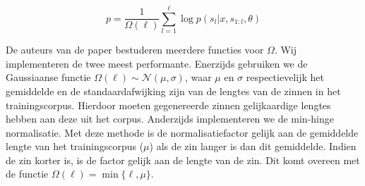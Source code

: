 \begin{equation}
p = \frac{1}{\Omega(\ell)}\sum_{l=1}^{\ell} \log p(s_l | x, s_{1:l}, \theta)
\label{eq:log-sentence-norm}
\end{equation}

De auteurs van de paper bestuderen meerdere functies voor $\Omega$. Wij implementeren de twee meest performante.
Enerzijds gebruiken we de Gaussiaanse functie $\Omega(\ell) \sim \mathcal{N}(\mu, \sigma)$, waar $\mu$ en $\sigma$ respectievelijk het gemiddelde en de standaardafwijking zijn van de lengtes van de zinnen in het trainingscorpus. Hierdoor moeten gegenereerde zinnen gelijkaardige lengtes hebben aan deze uit het corpus.
Anderzijds implementeren we de min-hinge normalisatie. Met deze methode is de normalisatiefactor gelijk aan de gemiddelde lengte van het trainingscorpus ($\mu$) als de zin langer is dan dit gemiddelde. Indien de zin korter is, is de factor gelijk aan de lengte van de zin. Dit komt overeen met de functie $\Omega(\ell)=\min\{\ell, \mu\}$.
